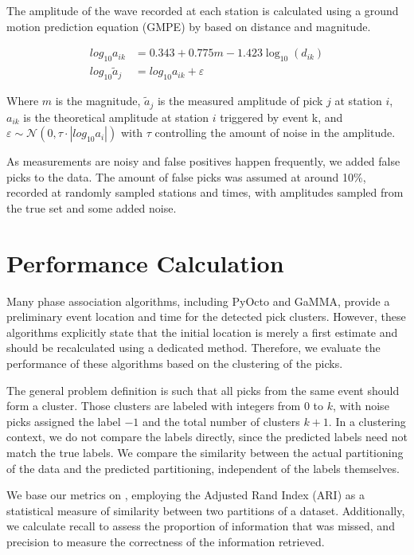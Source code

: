 \documentclass{scrreprt}
\begin{document}
The amplitude of the wave recorded at each station is calculated using a ground motion prediction equation (GMPE) by \citet{butler1993apquant} based on distance and magnitude.

\begin{equation}\label{eq:gmpe}
    \begin{aligned}
    log_{10}a_{ik} & = 0.343+0.775m - 1.423\log_{10}(d_{ik}) \\
    log_{10}\tilde{a}_j & = log_{10}a_{ik} + \varepsilon
    \end{aligned}
\end{equation}

Where $m$ is the magnitude, $\tilde{a}_j$ is the measured amplitude of pick $j$ at station $i$, $a_{ik}$ is the theoretical amplitude at station $i$ triggered by event k, and $\varepsilon \sim \mathcal{N}(0, \tau\cdot|log_{10}a_i|)$ with $\tau$ controlling the amount of noise in the amplitude.

As measurements are noisy and false positives happen frequently, we added false picks to the data. The amount of false picks was assumed at around 10\%, recorded at randomly sampled stations and times, with amplitudes sampled from the true set and some added noise. 

\section{Performance Calculation}

Many phase association algorithms, including PyOcto and GaMMA, provide a preliminary event location and time for the detected pick clusters. However, these algorithms explicitly state that the initial location is merely a first estimate and should be recalculated using a dedicated method. Therefore, we evaluate the performance of these algorithms based on the clustering of the picks.

The general problem definition is such that all picks from the same event should form a cluster. Those clusters are labeled with integers from $0$ to $k$, with noise picks assigned the label $-1$ and the total number of clusters $k+1$. In a clustering context, we do not compare the labels directly, since the predicted labels need not match the true labels. We compare the similarity between the actual partitioning of the data and the predicted partitioning, independent of the labels themselves.

We base our metrics on \citet{hubert1985comparing}, employing the Adjusted Rand Index (ARI) as a statistical measure of similarity between two partitions of a dataset. Additionally, we calculate recall to assess the proportion of information that was missed, and precision to measure the correctness of the information retrieved.
\end{document}
